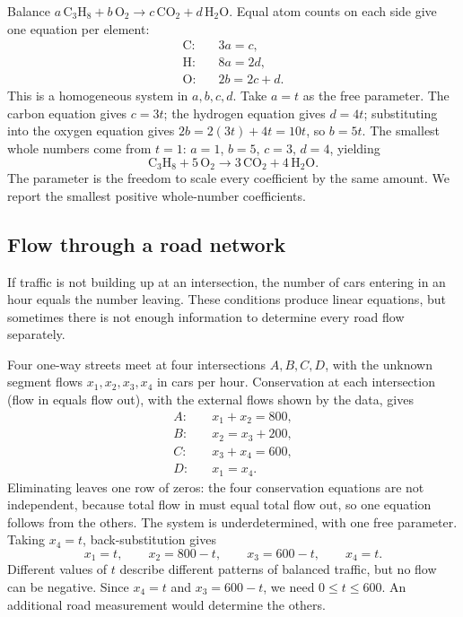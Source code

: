 \documentclass[12pt]{book}
\begin{document}
\begin{example}
Balance $a\,\mathrm{C_3H_8}+b\,\mathrm{O_2}\to c\,\mathrm{CO_2}+d\,\mathrm{H_2O}$.
Equal atom counts on each side give one equation per element:
\[
\begin{aligned}
\text{C:}&\quad 3a=c,\\
\text{H:}&\quad 8a=2d,\\
\text{O:}&\quad 2b=2c+d.
\end{aligned}
\]
This is a homogeneous system in $a,b,c,d$. Take $a=t$ as the free parameter. The
carbon equation gives $c=3t$; the hydrogen equation gives $d=4t$; substituting into
the oxygen equation gives $2b=2(3t)+4t=10t$, so $b=5t$. The smallest whole numbers
come from $t=1$: $a=1$, $b=5$, $c=3$, $d=4$, yielding
\[
\mathrm{C_3H_8}+5\,\mathrm{O_2}\to3\,\mathrm{CO_2}+4\,\mathrm{H_2O}.
\]
The parameter is the freedom to scale every coefficient
by the same amount. We report the smallest positive
whole-number coefficients.
\end{example}

\subsection{Flow through a road network}

If traffic is not building up at an intersection, the number
of cars entering in an hour equals the number leaving.
These conditions produce linear equations, but sometimes
there is not enough information to determine every
road flow separately.

\begin{example}
Four one-way streets meet at four intersections $A,B,C,D$, with the unknown segment
flows $x_1,x_2,x_3,x_4$ in cars per hour. Conservation at each intersection (flow in
equals flow out), with the external flows shown by the data, gives
\[
\begin{aligned}
A:&\quad x_1+x_2=800,\\
B:&\quad x_2=x_3+200,\\
C:&\quad x_3+x_4=600,\\
D:&\quad x_1=x_4.
\end{aligned}
\]
Eliminating leaves one row of zeros: the four conservation equations are not
independent, because total flow in must equal total flow out, so one equation follows
from the others. The system is underdetermined, with one free parameter. Taking
$x_4=t$, back-substitution gives
\[
x_1=t,\qquad x_2=800-t,\qquad x_3=600-t,\qquad x_4=t.
\]
Different values of $t$ describe different patterns of
balanced traffic, but no flow can be negative. Since
$x_4=t$ and $x_3=600-t$, we need $0\le t\le600$.
An additional road measurement would determine the others.
\end{example}
\end{document}
